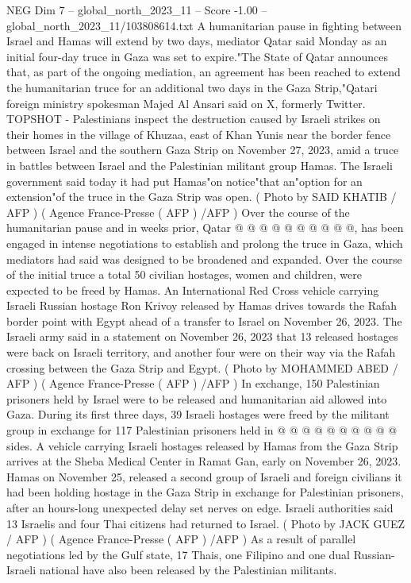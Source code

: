 \begin{textsample}{NEG Dim 7 – global\_north\_2023\_11 – Score -1.00 – global\_north\_2023\_11/103808614.txt}  \label{ex:f7_neg_325}
A humanitarian pause in fighting between Israel and Hamas will extend by two days, mediator Qatar said Monday as an initial four-day truce in Gaza was set to expire."The State of Qatar announces that, as part of the ongoing mediation, an agreement has been reached to extend the humanitarian truce for an additional two days in the Gaza Strip,"Qatari foreign ministry spokesman Majed Al Ansari said on X, formerly Twitter.
TOPSHOT - Palestinians inspect the destruction caused by Israeli strikes on their homes in the village of Khuzaa, east of Khan Yunis near the border fence between Israel and the southern Gaza Strip on November 27, 2023, amid a truce in battles between Israel and the Palestinian militant group Hamas.
The Israeli government said today it had put Hamas"on notice"that an"option for an extension"of the truce in the Gaza Strip was open. ( Photo by SAID KHATIB / AFP ) ( Agence France-Presse ( AFP ) /AFP ) Over the course of the humanitarian pause and in weeks prior, Qatar @ @ @ @ @ @ @ @ @ @, has been engaged in intense negotiations to establish and prolong the truce in Gaza, which mediators had said was designed to be broadened and expanded.
Over the course of the initial truce a total 50 civilian hostages, women and children, were expected to be freed by Hamas.
An International Red Cross vehicle carrying Israeli Russian hostage Ron Krivoy released by Hamas drives towards the Rafah border point with Egypt ahead of a transfer to Israel on November 26, 2023.
The Israeli army said in a statement on November 26, 2023 that 13 released hostages were back on Israeli territory, and another four were on their way via the Rafah crossing between the Gaza Strip and Egypt. ( Photo by MOHAMMED ABED / AFP ) ( Agence France-Presse ( AFP ) /AFP ) In exchange, 150 Palestinian prisoners held by Israel were to be released and humanitarian aid allowed into Gaza.
During its first three days, 39 Israeli hostages were freed by the militant group in exchange for 117 Palestinian prisoners held in @ @ @ @ @ @ @ @ @ @ sides.
A vehicle carrying Israeli hostages released by Hamas from the Gaza Strip arrives at the Sheba Medical Center in Ramat Gan, early on November 26, 2023.
Hamas on November 25, released a second group of Israeli and foreign civilians it had been holding hostage in the Gaza Strip in exchange for Palestinian prisoners, after an hours-long unexpected delay set nerves on edge.
Israeli authorities said 13 Israelis and four Thai citizens had returned to Israel. ( Photo by JACK GUEZ / AFP ) ( Agence France-Presse ( AFP ) /AFP ) As a result of parallel negotiations led by the Gulf state, 17 Thais, one Filipino and one dual Russian-Israeli national have also been released by the Palestinian militants.

\end{textsample}
